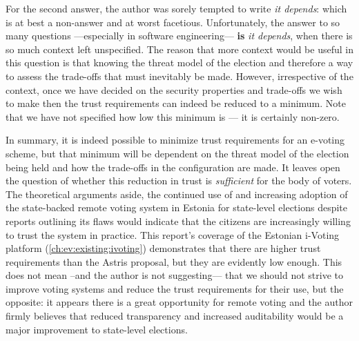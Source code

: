 For the second answer, the author was sorely tempted to write \emph{it depends}: which is at best a non-answer and at worst facetious. Unfortunately, the answer to so many questions ---especially in software engineering--- \textbf{is} \emph{it depends}, when there is so much context left unspecified. The reason that more context would be useful in this question is that knowing the threat model of the election and therefore a way to assess the trade-offs that must inevitably be made. However, irrespective of the context, once we have decided on the security properties and trade-offs we wish to make then the trust requirements can indeed be reduced to a minimum. Note that we have not specified how low this minimum is --- it is certainly non-zero.

In summary, it is indeed possible to minimize trust requirements for an e-voting scheme, but that minimum will be dependent on the threat model of the election being held and how the trade-offs in the configuration are made. It leaves open the question of whether this reduction in trust is \emph{sufficient} for the body of voters. The theoretical arguments aside, the continued use of and increasing adoption of the state-backed remote voting system in Estonia for state-level elections despite reports outlining its flaws would indicate that the citizens are increasingly willing to trust the system in practice. This report's coverage of the Estonian i-Voting platform (\autoref{ch:ev:existing:ivoting}) demonstrates that there are higher trust requirements than the Astris proposal, but they are evidently low enough. This does not mean --and the author is not suggesting--- that we should not strive to improve voting systems and reduce the trust requirements for their use, but the opposite: it appears there is a great opportunity for remote voting and the author firmly believes that reduced transparency and increased auditability would be a major improvement to state-level elections.
